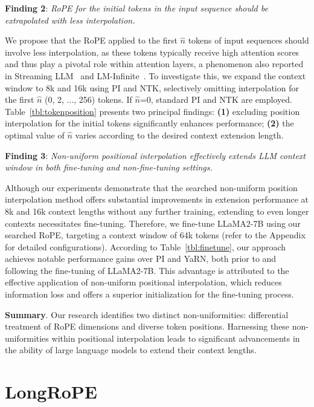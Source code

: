 \textbf{Finding 2}: \textit{RoPE for the initial tokens in the input sequence should be extrapolated with less interpolation.} 

We propose that the RoPE applied to the first $\hat{n}$ tokens of input sequences should involve less interpolation, as these tokens typically receive high attention scores and thus play a pivotal role within attention layers, a phenomenon also reported in Streaming LLM~\cite{streamingllm} and LM-Infinite~\cite{han2023lminfinite}. To investigate this, we expand the context window to 8k and 16k using PI and NTK, selectively omitting interpolation for the first $\hat n$ (0, 2, ..., 256) tokens. If $\hat n$=0, standard PI and NTK are employed. Table~\ref{tbl:tokenposition} presents two principal findings: \textbf{(1)} excluding position interpolation for the initial tokens significantly enhances performance; \textbf{(2)} the optimal value of $\hat n$ varies according to the desired context extension length.

\textbf{Finding 3}: \textit{Non-uniform positional interpolation effectively extends LLM context window in both fine-tuning and non-fine-tuning settings.} 

Although our experiments demonstrate that the searched non-uniform position interpolation method offers substantial improvements in extension performance at 8k and 16k context lengths without any further training, extending to even longer contexts necessitates fine-tuning. Therefore, we fine-tune LLaMA2-7B using our searched RoPE, targeting a context window of 64k tokens (refer to the Appendix for detailed configurations). According to Table~\ref{tbl:finetune}, our approach achieves notable performance gains over PI and YaRN, both prior to and following the fine-tuning of LLaMA2-7B. This advantage is attributed to the effective application of non-uniform positional interpolation, which reduces information loss and offers a superior initialization for the fine-tuning process.

\textbf{Summary}. Our research identifies two distinct non-uniformities: differential treatment of RoPE dimensions and diverse token positions. Harnessing these non-uniformities within positional interpolation leads to significant advancements in the ability of large language models to extend their context lengths.

\section{LongRoPE}

